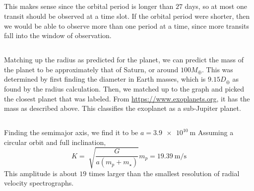 \documentclass{article}
\begin{document}
\subsection{}

This makes sense since the orbital period is longer than \(27\) days, so at most one transit should be observed at a time slot.
If the orbital period were shorter, then we would be able to observe more than one period at a time, since more transits fall into the window of observation.

\subsection{}

Matching up the radius as predicted for the planet, we can predict the mass of the planet to be approximately that of Saturn, or around \(100 M_\oplus\).
This was determined by first finding the diameter in Earth masses, which is \(9.15 D_\oplus\) as found by the radius calculation.
Then, we matched up to the graph and picked the closest planet that was labeled.
From \url{https://www.exoplanets.org}, it has the mass as described above.
This classifies the exoplanet as a sub-Jupiter planet.

\subsection{}

Finding the semimajor axis, we find it to be \(a = \SI{3.9e+10}{\meter}\)
Assuming a circular orbit and full inclination,
\begin{equation}
    K = \sqrt[]{\frac{G}{a (m_p + m_\star)}} m_p = \SI{19.39}{\meter\per\second}
\end{equation}
This amplitude is about \(19\) times larger than the smallest resolution of radial velocity spectrographs.
\end{document}
